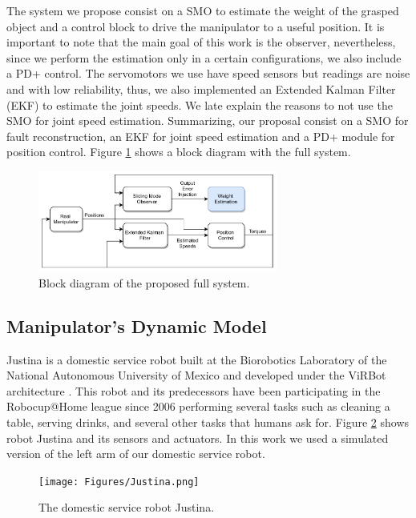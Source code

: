 \documentclass[smallextended]{svjour3}       %
\begin{document}
The system we propose consist on a SMO to estimate the weight of the grasped object and a control block to drive the manipulator to a useful position. It is important to note that the main goal of this work is the observer, nevertheless, since we perform the estimation only in a certain configurations, we also include a PD+ control. The servomotors we use have speed sensors but readings are noise and with low reliability, thus, we also implemented an Extended Kalman Filter (EKF) to estimate the joint speeds. We late explain the reasons to not use the SMO for joint speed estimation. Summarizing, our proposal consist on a SMO for fault reconstruction, an EKF for joint speed estimation and a PD+ module for position control. Figure \ref{fig:FullSystemBlocks} shows a block diagram with the full system. 
\begin{figure}
  \centering
  \includegraphics[width=0.7\textwidth]{Figures/full_system.pdf}
  \caption{Block diagram of the proposed full system.}
  \label{fig:FullSystemBlocks}
\end{figure}

\subsection{Manipulator's Dynamic Model}

Justina is a domestic service robot built at the Biorobotics Laboratory of the National Autonomous University of Mexico and developed under the ViRBot architecture \cite{savage2008virbot}. This robot and its predecessors have been participating in the Robocup@Home league \cite{wachsmuth2015robocup} since 2006 performing several tasks such as cleaning a table, serving drinks, and several other tasks that humans ask for. Figure \ref{fig:Justina} shows robot Justina and its sensors and actuators. In this work we used a simulated version of the left arm of our domestic service robot.

\begin{figure}
  \centering
  \texttt{[image: Figures/Justina.png]}
  \caption{The domestic service robot Justina.}
  \label{fig:Justina}
\end{figure}
\end{document}
